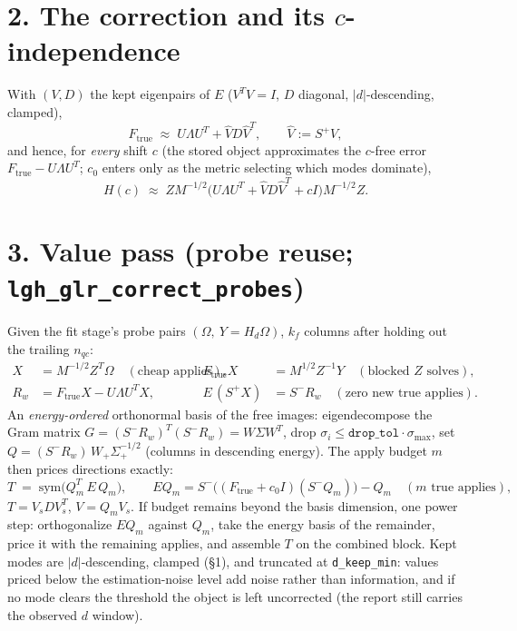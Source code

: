 \documentclass[11pt]{article}
\begin{document}
\section*{2. The correction and its $c$-independence}

With $(V, D)$ the kept eigenpairs of $E$ ($V^T V = I$, $D$ diagonal,
$|d|$-descending, clamped),
\begin{equation}
F_{\mathrm{true}} \;\approx\; U \Lambda U^T + \widehat{V} D \widehat{V}^T,
\qquad \widehat{V} := S^{+} V,
\label{eq:corr}
\end{equation}
and hence, for \emph{every} shift $c$ (the stored object approximates the
$c$-free error $F_{\mathrm{true}} - U\Lambda U^T$; $c_0$ enters only as the
metric selecting which modes dominate),
\begin{equation}
H(c) \;\approx\; Z M^{-1/2} \bigl(U \Lambda U^T
  + \widehat{V} D \widehat{V}^T + cI\bigr) M^{-1/2} Z .
\end{equation}

\section*{3. Value pass (probe reuse; \texttt{lgh\_glr\_correct\_probes})}

Given the fit stage's probe pairs $(\Omega,\ Y = H_d \Omega)$, $k_f$ columns
after holding out the trailing $n_{qc}$:
\begin{align}
X &= M^{-1/2} Z^T \Omega \quad (\text{cheap applies}), &
F_{\mathrm{true}} X &= M^{1/2} Z^{-1} Y \quad (\text{blocked $Z$ solves}),\\
R_w &= F_{\mathrm{true}} X - U \Lambda U^T X, &
E\,(S^{+} X) &= S^- R_w \quad (\text{zero new true applies}).
\end{align}
An \emph{energy-ordered} orthonormal basis of the free images: eigendecompose
the Gram matrix $G = (S^- R_w)^T (S^- R_w) = W \Sigma W^T$, drop
$\sigma_i \le \texttt{drop\_tol}\cdot\sigma_{\max}$, set
$Q = (S^- R_w)\, W_+ \Sigma_+^{-1/2}$ (columns in descending energy).
The apply budget $m$ then prices directions exactly:
\begin{equation}
T \;=\; \mathrm{sym}\bigl(Q_m^T\, E\, Q_m\bigr), \qquad
E Q_m = S^-\bigl((F_{\mathrm{true}} + c_0 I)(S^- Q_m)\bigr) - Q_m
\quad (\text{$m$ true applies}),
\end{equation}
$T = V_s D V_s^T$, $V = Q_m V_s$.  If budget remains beyond the basis
dimension, one power step: orthogonalize $E Q_m$ against $Q_m$, take the
energy basis of the remainder, price it with the remaining applies, and
assemble $T$ on the combined block.  Kept modes are $|d|$-descending,
clamped (\S1), and truncated at \texttt{d\_keep\_min}: values priced below
the estimation-noise level add noise rather than information, and if no
mode clears the threshold the object is left uncorrected (the report still
carries the observed $d$ window).
\end{document}
